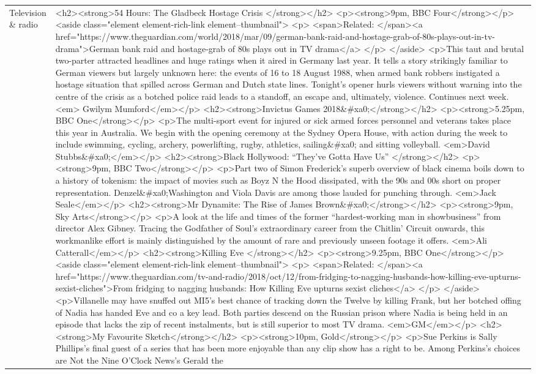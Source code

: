 \documentclass[]{article}
\begin{document}
\begin{table}[!h]
{\begin{tabular}[t]{ll}
Television \& radio & <h2><strong>54 Hours: The Gladbeck Hostage Crisis </strong></h2> <p><strong>9pm, BBC Four</strong></p> <aside class="element element-rich-link element--thumbnail"> <p> <span>Related: </span><a href="https://www.theguardian.com/world/2018/mar/09/german-bank-raid-and-hostage-grab-of-80s-plays-out-in-tv-drama">German bank raid and hostage-grab of 80s plays out in TV drama</a> </p> </aside>  <p>This taut and brutal two-parter attracted headlines and huge ratings when it aired in Germany last year. It tells a story strikingly familiar to German viewers but largely unknown here: the events of 16 to 18 August 1988, when armed bank robbers instigated a hostage situation that spilled across German and Dutch state lines. Tonight’s opener hurls viewers without warning into the centre of the crisis as a botched police raid leads to a standoff, an escape and, ultimately, violence. Continues next week.<em> Gwilym Mumford</em></p> <h2><strong>Invictus Games 2018\&\#xa0;</strong></h2> <p><strong>5.25pm, BBC One</strong></p> <p>The multi-sport event for injured or sick armed forces personnel and veterans takes place this year in Australia. We begin with the opening ceremony at the Sydney Opera House, with action during the week to include swimming, cycling, archery, powerlifting, rugby, athletics, sailing\&\#xa0; and sitting volleyball. <em>David Stubbs\&\#xa0;</em></p> <h2><strong>Black Hollywood: “They’ve Gotta Have Us” </strong></h2> <p><strong>9pm, BBC Two</strong></p> <p>Part two of Simon Frederick’s superb overview of black cinema boils down to a history of tokenism: the impact of movies such as Boyz N the Hood dissipated, with the 90s and 00s short on proper representation. Denzel\&\#xa0;Washington and Viola Davis are among those lauded for punching through. <em>Jack Seale</em></p> <h2><strong>Mr Dynamite: The Rise of James Brown\&\#xa0;</strong></h2> <p><strong>9pm, Sky Arts</strong></p> <p>A look at the life and times of the former “hardest-working man in showbusiness” from director Alex Gibney. Tracing the Godfather of Soul’s extraordinary career from the Chitlin’ Circuit onwards, this workmanlike effort is mainly distinguished by the amount of rare and previously unseen footage it offers. <em>Ali Catterall</em></p> <h2><strong>Killing Eve </strong></h2> <p><strong>9.25pm, BBC One</strong></p> <aside class="element element-rich-link element--thumbnail"> <p> <span>Related: </span><a href="https://www.theguardian.com/tv-and-radio/2018/oct/12/from-fridging-to-nagging-husbands-how-killing-eve-upturns-sexist-cliches">From fridging to nagging husbands: How Killing Eve upturns sexist cliches</a> </p> </aside>  <p>Villanelle may have snuffed out MI5’s best chance of tracking down the Twelve by killing Frank, but her botched offing of Nadia has handed Eve and co a key lead. Both parties descend on the Russian prison where Nadia is being held in an episode that lacks the zip of recent instalments, but is still superior to most TV drama. <em>GM</em></p> <h2><strong>My Favourite Sketch</strong></h2> <p><strong>10pm, Gold</strong></p> <p>Sue Perkins is Sally Phillips’s final guest of a series that has been more enjoyable than any clip show has a right to be. Among Perkins’s choices are Not the Nine O’Clock News’s Gerald the 
\end{tabular}}
\end{table}
\end{document}
